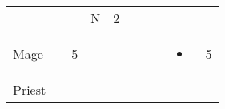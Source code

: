 \documentclass[12pt]{article}
\begin{document}
\begin{longtable}[]{@{}llllllllll@{}}
\begin{minipage}[t]{0.06\columnwidth}
\strut\end{minipage} &
\begin{minipage}[t]{0.06\columnwidth}\raggedright\strut
\strut\end{minipage} &
\begin{minipage}[t]{0.06\columnwidth}\raggedright\strut
\strut\end{minipage} &
\begin{minipage}[t]{0.07\columnwidth}\raggedright\strut
N
\strut\end{minipage} &
\begin{minipage}[t]{0.08\columnwidth}\raggedright\strut
2
\strut\end{minipage}\tabularnewline
\begin{minipage}[t]{0.13\columnwidth}\raggedright\strut
Mage
\strut\end{minipage} &
\begin{minipage}[t]{0.06\columnwidth}\raggedright\strut
\strut\end{minipage} &
\begin{minipage}[t]{0.06\columnwidth}\raggedright\strut
5
\strut\end{minipage} &
\begin{minipage}[t]{0.06\columnwidth}\raggedright\strut
\strut\end{minipage} &
\begin{minipage}[t]{0.06\columnwidth}\raggedright\strut
\strut\end{minipage} &
\begin{minipage}[t]{0.06\columnwidth}\raggedright\strut
\strut\end{minipage} &
\begin{minipage}[t]{0.06\columnwidth}\raggedright\strut
\strut\end{minipage} &
\begin{minipage}[t]{0.06\columnwidth}\raggedright\strut
\strut\end{minipage} &
\begin{minipage}[t]{0.07\columnwidth}\raggedright\strut
\begin{itemize}
\item
\end{itemize}
\strut\end{minipage} &
\begin{minipage}[t]{0.08\columnwidth}\raggedright\strut
5
\strut\end{minipage}\tabularnewline
\begin{minipage}[t]{0.13\columnwidth}\raggedright\strut
Priest
\strut\end{minipage} &

\end{longtable}
\end{document}
